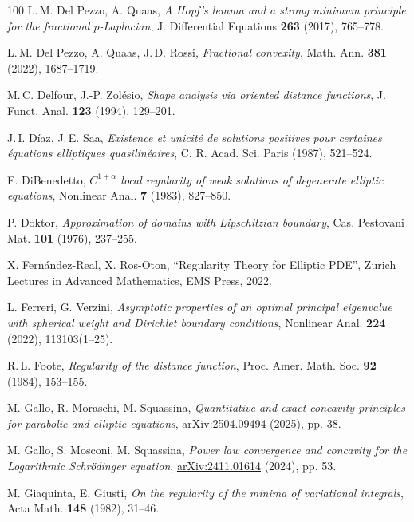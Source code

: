 \documentclass[11pt, reqno]{amsart}
\theoremstyle{definition}
\numberwithin{equation}{section}
\begin{document}
\begin{thebibliography}{100}
 L.$\,$M. Del Pezzo, A. Quaas,
\emph{A Hopf’s lemma and a strong minimum principle for the fractional $p$-Laplacian},
J. Differential Equations \textbf{263} (2017), %
765--778.

 L.$\,$M. Del Pezzo, A. Quaas, J.$\,$D. Rossi,
\emph{Fractional convexity},
Math. Ann. \textbf{381} (2022), %
1687--1719.

 M.$\,$C. Delfour, J.-P. Zolésio,
\emph{Shape analysis via oriented distance functions},
J. Funct. Anal. \textbf{123} (1994), %
129--201.

 J.$\,$I. Díaz, J.$\,$E. Saa,
\emph{Existence et unicité de solutions positives pour certaines équations elliptiques quasilinéaires},
C. R. Acad. Sci. Paris %
(1987), %
521--524.

 E. DiBenedetto,
\emph{$C^{1+\alpha}$ local regularity of weak solutions of degenerate elliptic equations},
Nonlinear Anal. \textbf{7} (1983), %
827--850.

 P. Doktor,
\emph{Approximation of domains with Lipschitzian boundary},
Cas. Pestovani Mat. \textbf{101} (1976), %
237--255.

 X. Fernández-Real, X. Ros-Oton,
``Regularity Theory for Elliptic PDE'',
Zurich Lectures in Advanced Mathematics, EMS Press, 2022.

 L. Ferreri, G. Verzini, 
\emph{Asymptotic properties of an optimal principal eigenvalue with
spherical weight and Dirichlet boundary conditions},
Nonlinear Anal. \textbf{224} (2022), %
113103(1--25).

 R.$\,$L. Foote,
\emph{Regularity of the distance function},
Proc. Amer. Math. Soc. \textbf{92} (1984), %
153--155.

 M. Gallo, R. Moraschi, M. Squassina,
\emph{Quantitative and exact concavity principles for parabolic and elliptic equations},
\href{https://doi.org/10.48550/arXiv.2504.09494}{arXiv:2504.09494} (2025), pp. 38.

 M. Gallo, S. Mosconi, M. Squassina,
\emph{Power law convergence and concavity for the Logarithmic Schrödinger equation}, 
\href{https://doi.org/10.48550/arXiv.2411.0161}{arXiv:2411.01614} (2024), pp. 53.

 M. Giaquinta, E. Giusti,
\emph{On the regularity of the minima of variational integrals},
Acta Math. \textbf{148} (1982), %
31--46. 


\end{thebibliography}
\end{document}
